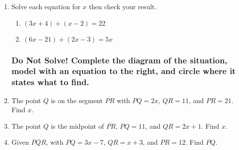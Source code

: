 \begin{enumerate}[itemsep=1.2cm]
\item Solve each equation for $x$ then check your result.
\begin{multicols}{2}
  \begin{enumerate}
    \item $(3x+4) + (x-2)=22$
    \item $(6x-21) + (2x-3)=5x$
  \end{enumerate}
\end{multicols}

\newpage
\subsubsection*{Do Not Solve! Complete the diagram of the situation, model with an equation to the right, and circle where it states what to find.}
\item The point $Q$ is on the segment $\overline{PR}$ with $PQ=2x$, $QR=11$, and $PR=21$. Find $x$. \vspace{0.5cm}
  \begin{flushleft}
  \end{flushleft}

\item The point $Q$ is the midpoint of $\overline{PR}$, $PQ=11$, and $QR=2x+1$. Find $x$. \vspace{0.5cm}
  \begin{flushleft}
  \end{flushleft}

\item Given $\overline{PQR}$, with $PQ=3x-7$, $QR=x+3$, and $PR=12$. Find $PQ$. \vspace{0.5cm}
  \begin{flushleft}
  \end{flushleft}


\end{enumerate}
